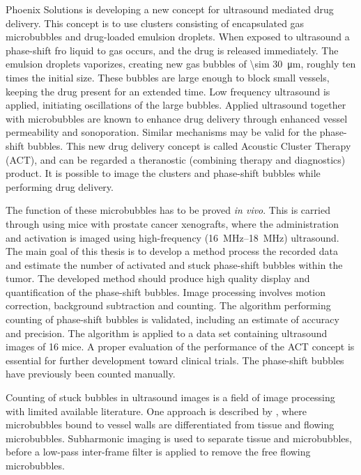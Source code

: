 Phoenix Solutions is developing a new concept for ultrasound mediated drug delivery. This concept is to use clusters consisting of encapsulated gas microbubbles and drug-loaded emulsion droplets. When exposed to ultrasound a phase-shift fro liquid to gas occurs, and the drug is released immediately. The emulsion droplets vaporizes, creating new gas bubbles of \SI{\sim 30}{\micro\meter}, roughly ten times the initial size. These bubbles are large enough to block small vessels, keeping the drug present for an extended time. Low frequency ultrasound is applied, initiating oscillations of the large bubbles. Applied ultrasound together with microbubbles are known to enhance drug delivery through enhanced vessel permeability and sonoporation\cite{VanWamel2006a}. Similar mechanisms may be valid for the phase-shift bubbles. This new drug delivery concept is called Acoustic Cluster Therapy (ACT\texttrademark{}), and can be regarded a theranostic (combining therapy and diagnostics) product. It is possible to image the clusters and phase-shift bubbles while performing drug delivery.

The function of these microbubbles has to be proved \textit{in vivo}. This is carried through using mice with prostate cancer xenografts, where the administration and activation is imaged using high-frequency (\SIrange{16}{18}{\mega\hertz}) ultrasound. The main goal of this thesis is to develop a method process the recorded data and estimate the number of activated and stuck phase-shift bubbles within the tumor. The developed method should produce high quality display and quantification of the phase-shift bubbles. Image processing involves motion correction, background subtraction and counting. The algorithm performing counting of phase-shift bubbles is validated, including an estimate of accuracy and precision. The algorithm is applied to a data set containing ultrasound images of 16 mice. A proper evaluation of the performance of the ACT\texttrademark{} concept is essential for further development toward clinical trials. The phase-shift bubbles have previously been counted manually. 

Counting of stuck bubbles in ultrasound images is a field of image processing with limited available literature. One approach is described by \citeauthor{Needles2009}, where microbubbles bound to vessel walls are differentiated from tissue and flowing microbubbles\cite{Needles2009}. Subharmonic imaging is used to separate tissue and microbubbles, before a low-pass inter-frame filter is applied to remove the free flowing microbubbles. 






